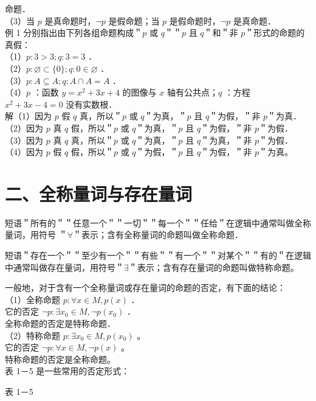\documentclass[10pt]{article}
\begin{document}
命题．\\
（3）当 \(p\) 是真命题时，\(\neg p\) 是假命题；当 \(p\) 是假命题时，\(\neg p\) 是真命题．\\
例 1 分别指出由下列各组命题构成＂\(p\) 或 \(q\)＂＂\(p\) 且 \(q\)＂和＂非 \(p\)＂形式的命题的真假：\\
（1）\(p: 3>3 ; q: 3=3\) ．\\
（2）\(p: \varnothing \subset\{0\} ; q: 0 \in \varnothing\) ．\\
（3）\(p: A \subseteq A ; q: A \cap A=A\) ．\\
（4）\(p\) ：函数 \(y=x^{2}+3 x+4\) 的图像与 \(x\) 轴有公共点；\(q\) ：方程 \(x^{2}+3 x-4=0\) 没有实数根．\\
解（1）因为 \(p\) 假 \(q\) 真，所以＂\(p\) 或 \(q\)＂为真，＂\(p\) 且 \(q\)＂为假，＂非 \(p\)＂为真．\\
（2）因为 \(p\) 真 \(q\) 假，所以＂\(p\) 或 \(q\)＂为真，＂\(p\) 且 \(q\)＂为假，＂非 \(p\)＂为假．\\
（3）因为 \(p\) 真 \(q\) 真，所以＂\(p\) 或 \(q\)＂为真，＂\(p\) 且 \(q\)＂为真，＂非 \(p\)＂为假．\\
（4）因为 \(p\) 假 \(q\) 假，所以＂\(p\) 或 \(q\)＂为假，＂\(p\) 且 \(q\)＂为假，＂非 \(p\)＂为真。

\section*{二、全称量词与存在量词}
短语＂所有的＂＂任意一个＂＂一切＂＂每一个＂＂任给＂在逻辑中通常叫做全称量词，用符号 ＂\(\forall\)＂表示；含有全称量词的命题叫做全称命题．

短语＂存在一个＂＂至少有一个＂＂有些＂＂有一个＂＂对某个＂＂有的＂在逻辑中通常叫做存在量词，用符号＂\(\exists\)＂表示；含有存在量词的命题叫做特称命题。

一般地，对于含有一个全称量词或存在量词的命题的否定，有下面的结论：\\
（1）全称命题 \(p: \forall x \in M, p(x)\) ．\\
它的否定 \(\neg p: \exists x_{0} \in M, \neg p\left(x_{0}\right)\) ．\\
全称命题的否定是特称命题．\\
（2）特称命题 \(p: \exists x_{0} \in M, p\left(x_{0}\right)\) 。\\
它的否定 \(\neg p: \forall x \in M, \neg p(x)\) 。\\
特称命题的否定是全称命题。\\
表 1－5 是一些常用的否定形式：

表 1－5
\end{document}
